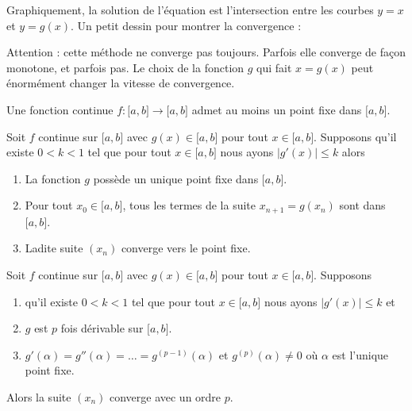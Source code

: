 Graphiquement, la solution de l'équation est l'intersection entre les courbes \( y=x\) et \( y=g(x)\). Un petit dessin pour montrer la convergence :

\begin{center}
	
\end{center}

Attention : cette méthode ne converge pas toujours. Parfois elle converge de façon monotone, et parfois pas. Le choix de la fonction \( g\) qui fait \( x=g(x)\) peut énormément changer la vitesse de convergence.

\begin{theorem}
	Une fonction continue \( f\colon \mathopen[ a , b \mathclose]\to \mathopen[ a , b \mathclose]\) admet au moins un point fixe dans \( \mathopen[ a , b \mathclose]\).
\end{theorem}

\begin{theorem}
	Soit \( f\) continue sur \( \mathopen[ a , b \mathclose]\) avec \( g(x)\in\mathopen[ a , b \mathclose]\) pour tout \( x\in\mathopen[ a , b \mathclose]\). Supposons qu'il existe \( 0<k<1\) tel que pour tout \( x\in\mathopen[ a , b \mathclose]\) nous ayons \( | g'(x) |\leq k\) alors
	\begin{enumerate}
		\item
		      La fonction \( g\) possède un unique point fixe dans \( \mathopen[ a , b \mathclose]\).
		\item
		      Pour tout \( x_0\in\mathopen[ a , b \mathclose]\), tous les termes de la suite \( x_{n+1}=g(x_n)\) sont dans \( \mathopen[ a , b \mathclose]\).
		\item
		      Ladite suite \( (x_n)\) converge vers le point fixe.
	\end{enumerate}
\end{theorem}

\begin{theorem}
	Soit \( f\) continue sur \( \mathopen[ a , b \mathclose]\) avec \( g(x)\in\mathopen[ a , b \mathclose]\) pour tout \( x\in\mathopen[ a , b \mathclose]\). Supposons
	\begin{enumerate}
		\item
		      qu'il existe \( 0<k<1\) tel que pour tout \( x\in\mathopen[ a , b \mathclose]\) nous ayons \( | g'(x) |\leq k\) et
		\item
		      \( g\) est \( p\) fois dérivable sur \( \mathopen[ a , b \mathclose]\).
		\item
		      \( g'(\alpha)=g''(\alpha)=\ldots=g^{(p-1)}(\alpha)\) et \( g^{(p)}(\alpha)\neq 0\) où \( \alpha\) est l'unique point fixe.
	\end{enumerate}
	Alors la suite \( (x_n)\) converge avec un ordre \( p\).
\end{theorem}




